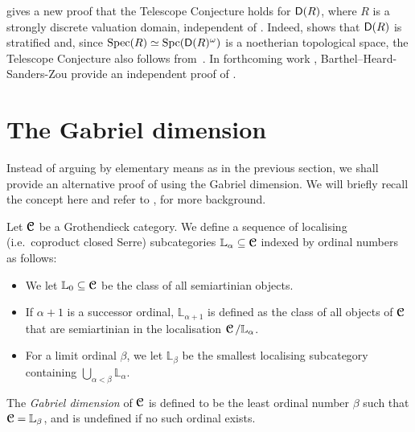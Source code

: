\documentclass[reqno,a4paper]{amsart}
\begin{document}
\begin{remark}
 gives a new proof that the Telescope Conjecture holds for $\mathsf{D}(R)$, where $R$ is a strongly discrete valuation domain, independent of \cite{gldm1}.
Indeed,  shows that $\mathsf{D}(R)$ is stratified and, since $\operatorname{Spec}(R)\simeq\operatorname{Spc}(\mathsf{D}(R)^\omega)$ is a noetherian topological space, the Telescope Conjecture also follows from~\cite[Theorem 9.11]{bhs23}.
In forthcoming work \cite{BHSZ}, Barthel--Heard-Sanders-Zou provide an  independent proof of .
\end{remark}

\section{The Gabriel dimension}
Instead of arguing by elementary means as in the previous section, we shall provide an alternative proof of  using the Gabriel dimension. We will briefly recall the concept here and refer to \cite[\S5.5]{pop73}, \cite{gab62} for more background.

\begin{definition}\label{def:Gabriel-dim}
Let $\operatorname{\boldsymbol{\mathcal{C}}}$ be a Grothendieck category. We define a sequence of localising (i.e.\ coproduct closed Serre) subcategories $\mathbb{L}_\alpha\subseteq\operatorname{\boldsymbol{\mathcal{C}}}$ indexed by ordinal numbers as follows:
\begin{itemize}
\item We let $\mathbb{L}_0\subseteq\operatorname{\boldsymbol{\mathcal{C}}}$ be the class of all semiartinian objects.
\item If $\alpha+1$ is a successor ordinal, $\mathbb{L}_{\alpha+1}$ is defined as the class of all objects of $\operatorname{\boldsymbol{\mathcal{C}}}$ that are semiartinian in the localisation $\operatorname{\boldsymbol{\mathcal{C}}}/\mathbb{L}_\alpha$.
\item For a limit ordinal $\beta$, we let $\mathbb{L}_\beta$ be the smallest localising subcategory containing $\bigcup_{\alpha<\beta}\mathbb{L}_\alpha$.
\end{itemize}
The \emph{Gabriel dimension} of $\operatorname{\boldsymbol{\mathcal{C}}}$ is defined to be the least ordinal number $\beta$ such that $\operatorname{\boldsymbol{\mathcal{C}}}=\mathbb{L}_\beta$, and is undefined if no such ordinal exists.
\end{definition}
\end{document}
